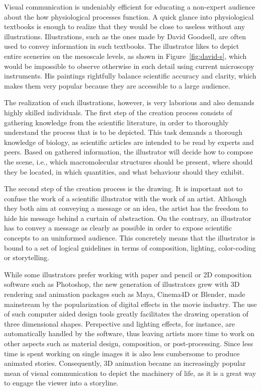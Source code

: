 Visual communication is undeniably efficient for educating a non-expert audience about the how physiological processes function.
A quick glance into physiological textbooks is enough to realize that they would be close to useless without any illustrations.
Illustrations, such as the ones made by David Goodsell, are often used to convey information in such textbooks.
The illustrator likes to depict entire sceneries on the mesoscale levels, as shown in Figure~\ref{fig:david-s}, which would be impossible to observe otherwise in such detail using current microscopy instruments.
His paintings rightfully balance scientific accuracy and clarity, which makes them very popular because they are accessible to a large audience.
 
The realization of such illustrations, however, is very laborious and also demands highly skilled individuals.
The first step of the creation process consists of gathering knowledge from the scientific literature, in order to thoroughly understand the process that is to be depicted.
This task demands a thorough knowledge of biology, as scientific articles are intended to be read by experts and peers.
Based on gathered information, the illustrator will decide how to compose the scene, i.e., which macromolecular structures should be present, where should they be located, in which quantities, and what behaviour should they exhibit.

The second step of the creation process is the drawing. 
It is important not to confuse the work of a scientific illustrator with the work of an artist.
Although they both aim at conveying a message or an idea, the artist has the freedom to hide his message behind a curtain of abstraction.
On the contrary, an illustrator has to convey a message as clearly as possible in order to expose scientific concepts to an uninformed audience.
This concretely means that the illustrator is bound to a set of logical guidelines in terms of composition, lighting, color-coding or storytelling.

While some illustrators prefer working with paper and pencil or 2D composition software such as Photoshop, the new generation of illustrators grew with 3D rendering and animation packages such as Maya, Cinema4D or Blender, made mainstream by the popularization of digital effects in the movie industry.
The use of such computer aided design tools greatly facilitates the drawing operation of three dimensional shapes.
Perspective and lighting effects, for instance, are automatically handled by the software, thus leaving artists more time to work on other aspects such as material design, composition, or post-processing.
Since less time is spent working on single images it is also less cumbersome to produce animated stories.
Consequently, 3D animation became an increasingly popular mean of visual communication to depict the machinery of life, as it is a great way to engage the viewer into a storyline.

